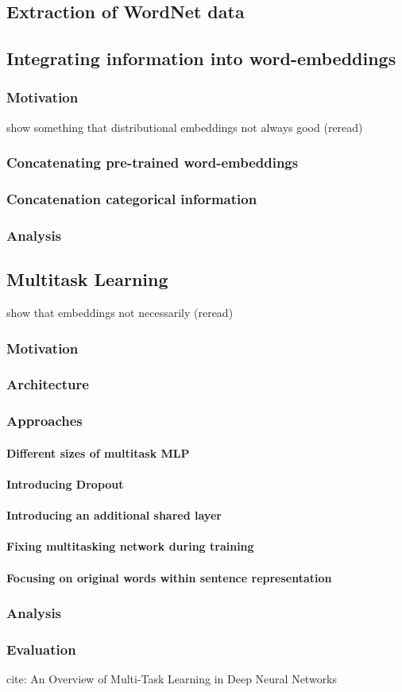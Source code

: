 \subsection{Extraction of WordNet data}
\subsection{Integrating information into word-embeddings}
\subsubsection{Motivation}
\citep{rubinstein2015well} show something that distributional embeddings not always good (reread)
\subsubsection{Concatenating pre-trained word-embeddings}
\subsubsection{Concatenation categorical information}
\subsubsection{Analysis}
\subsection{Multitask Learning}
\citep{levy2015improving} show that embeddings not necessarily (reread)
\subsubsection{Motivation}
\subsubsection{Architecture}
\subsubsection{Approaches}
\paragraph{Different sizes of multitask MLP}
\paragraph{Introducing Dropout}
\paragraph{Introducing an additional shared layer}
\paragraph{Fixing multitasking network during training}
\paragraph{Focusing on original words within sentence representation}
\subsubsection{Analysis}
\subsubsection{Evaluation}

cite: An Overview of Multi-Task Learning
in Deep Neural Networks